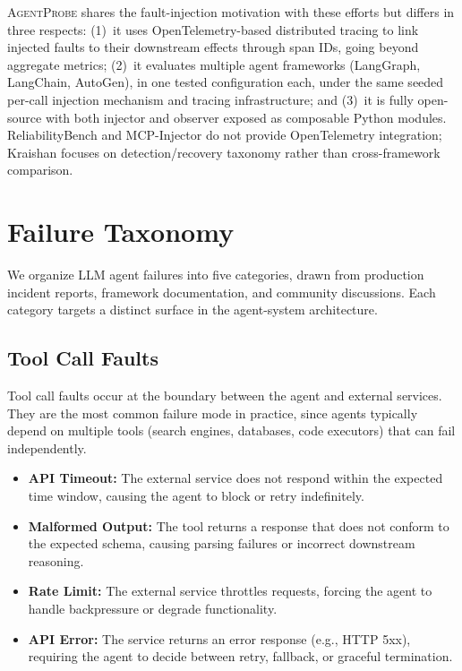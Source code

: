 \documentclass[make,article,submit,moreauthors,pdftex]{mdpi}
\providecommand{\agentprobe}{\textsc{AgentProbe}}
\newcommand{\Wrev}[1]{\texorpdfstring{{\color{RevisionOrange}#1}}{#1}}
\begin{document}
{\agentprobe{} shares the fault-injection motivation with these efforts but differs in three respects: (1)~it uses OpenTelemetry-based distributed tracing to link injected faults to their downstream effects through span IDs, going beyond aggregate metrics; (2)~it evaluates multiple agent frameworks (LangGraph, LangChain, AutoGen)\Wrev{, in one tested configuration each,} under the same seeded per-call injection mechanism and tracing infrastructure; and (3)~it is fully open-source with both injector and observer exposed as composable Python modules. ReliabilityBench and MCP-Injector do not provide OpenTelemetry integration; Kraishan focuses on detection/recovery taxonomy rather than cross-framework comparison.}


\section{Failure Taxonomy}\label{sec:taxonomy}

We organize LLM agent failures into five categories, drawn from production incident reports, framework documentation, and community discussions. Each category targets a distinct surface in the agent-system architecture.

\subsection{Tool Call Faults}

Tool call faults occur at the boundary between the agent and external services. They are the most common failure mode in practice, since agents typically depend on multiple tools (search engines, databases, code executors) that can fail independently.

\begin{itemize}
  \item \textbf{API Timeout:} The external service does not respond within the expected time window, causing the agent to block or retry indefinitely.
  \item \textbf{Malformed Output:} The tool returns a response that does not conform to the expected schema, causing parsing failures or incorrect downstream reasoning.
  \item \textbf{Rate Limit:} The external service throttles requests, forcing the agent to handle backpressure or degrade functionality.
  \item \textbf{API Error:} The service returns an error response (e.g., HTTP 5xx), requiring the agent to decide between retry, fallback, or graceful termination.
\end{itemize}
\end{document}
